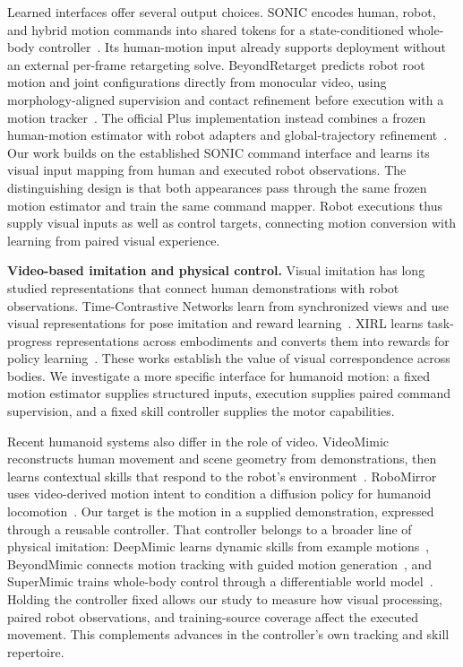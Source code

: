 Learned interfaces offer several output choices. SONIC encodes human, robot, and hybrid motion commands into shared tokens for a state-conditioned whole-body controller~\cite{sonic}. Its human-motion input already supports deployment without an external per-frame retargeting solve. BeyondRetarget predicts robot root motion and joint configurations directly from monocular video, using morphology-aligned supervision and contact refinement before execution with a motion tracker~\cite{beyondretarget}. The official Plus implementation instead combines a frozen human-motion estimator with robot adapters and global-trajectory refinement~\cite{beyondretargetpluscode}. Our work builds on the established SONIC command interface and learns its visual input mapping from human and executed robot observations. The distinguishing design is that both appearances pass through the same frozen motion estimator and train the same command mapper. Robot executions thus supply visual inputs as well as control targets, connecting motion conversion with learning from paired visual experience.

\textbf{Video-based imitation and physical control.}
Visual imitation has long studied representations that connect human demonstrations with robot observations. Time-Contrastive Networks learn from synchronized views and use visual representations for pose imitation and reward learning~\cite{tcn}. XIRL learns task-progress representations across embodiments and converts them into rewards for policy learning~\cite{xirl}. These works establish the value of visual correspondence across bodies. We investigate a more specific interface for humanoid motion: a fixed motion estimator supplies structured inputs, execution supplies paired command supervision, and a fixed skill controller supplies the motor capabilities.

Recent humanoid systems also differ in the role of video. VideoMimic reconstructs human movement and scene geometry from demonstrations, then learns contextual skills that respond to the robot's environment~\cite{videomimic}. RoboMirror uses video-derived motion intent to condition a diffusion policy for humanoid locomotion~\cite{robomirror}. Our target is the motion in a supplied demonstration, expressed through a reusable controller. That controller belongs to a broader line of physical imitation: DeepMimic learns dynamic skills from example motions~\cite{deepmimic}, BeyondMimic connects motion tracking with guided motion generation~\cite{beyondmimic}, and SuperMimic trains whole-body control through a differentiable world model~\cite{supermimic}. Holding the controller fixed allows our study to measure how visual processing, paired robot observations, and training-source coverage affect the executed movement. This complements advances in the controller's own tracking and skill repertoire.
